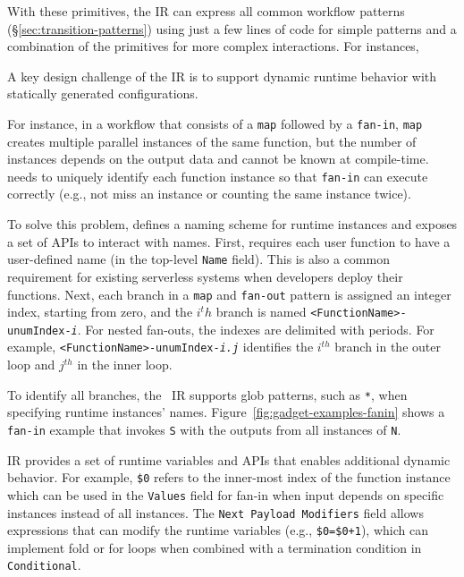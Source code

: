 With these primitives, the IR can express all common workflow patterns
(\S\ref{sec:transition-patterns}) using just a few lines of code for simple
patterns and a combination of the primitives for more complex interactions.
For instances, 




A key design challenge of the \name{} IR is to support dynamic runtime
behavior with statically generated configurations.

For instance, in a workflow that consists of a \texttt{map} followed by a
\texttt{fan-in}, \texttt{map} creates multiple parallel instances of the same
function, but the number of instances depends on the output data and cannot be
known at compile-time. \name{} needs to uniquely identify each function
instance so that \texttt{fan-in} can execute correctly (e.g., not miss an
instance or counting the same instance twice).

To solve this problem, \name{} defines a naming scheme for runtime instances
and exposes a set of APIs to interact with names. First,
\name{} requires each user function to have a user-defined name (in the
top-level \texttt{Name} field). This is also a common requirement for existing
serverless systems when developers deploy their functions. Next, each branch
in a \texttt{map} and \texttt{fan-out} pattern is assigned an integer index,
starting from zero, and the $i^th$ branch is named
\texttt{<FunctionName>-unumIndex-\emph{i}}. For nested fan-outs, the indexes
are delimited with periods. For example,
\texttt{<FunctionName>-unumIndex-\emph{i.j}} identifies the $i^{th}$ branch in
the outer loop and $j^{th}$ in the inner loop.

To identify all branches, the \name{}~IR supports glob patterns, such as
\texttt{*}, when specifying runtime instances' names.
Figure~\ref{fig:gadget-examples-fanin} shows a \texttt{fan-in} example that
invokes \texttt{S} with the outputs from all instances of \texttt{N}.

\name{} IR provides a set of runtime variables and APIs that enables
additional dynamic behavior. For example, \texttt{\$0} refers to the
inner-most index of the function instance which can be used in the
\texttt{Values} field for fan-in when input depends on specific instances
instead of all instances. The \texttt{Next Payload Modifiers} field allows
expressions that can modify the runtime variables (e.g., \texttt{\$0=\$0+1}),
which can implement fold or for loops when combined with a termination
condition in \texttt{Conditional}.


